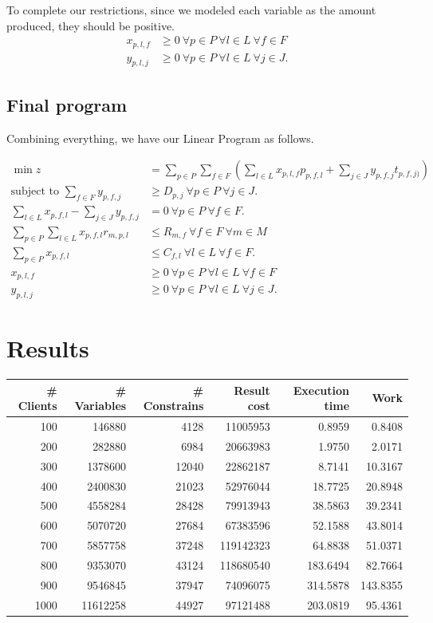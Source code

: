 \documentclass[11pt]{article}
\theoremstyle{definition}
\theoremstyle{definition}
\theoremstyle{remark}
\theoremstyle{remark}
\theoremstyle{remark}
\theoremstyle{remark}
\theoremstyle{definition}
\begin{document}
To complete our restrictions, since we modeled each variable as the amount produced, they should be positive.
\begin{align*}
x_{p,l,f} &\geq 0 \ \forall p \in P \ \forall l \in L \ \forall f \in F \\
y_{p,l,j} &\geq 0 \ \forall p \in P \ \forall l \in L \ \forall j \in J.
\end{align*}
\subsection*{Final program}
\label{sec:orgcc6b210}
Combining everything, we have our Linear Program as follows.


\begin{align*}
\min z &= \sum \limits_{p \in P} \sum_{f \in F} (\sum \limits_{l \in L} x_{p,l,f}p_{p,f,l} + \sum_{j \in J} y_{p,f,j}t_{p,f,j)}) \\
\text{subject to } \sum_{f \in F} y_{p,f,j} &\geq D_{p,j} \ \forall p \in P \ \forall j \in J. \\
\sum \limits_{l \in L} x_{p,f,l} - \sum_{j \in J} y_{p,f,j} &= 0 \ \forall p \in P \ \forall f \in F . \\
\sum \limits_{p \in P} \sum \limits_{l \in L} x_{p,f,l}r_{m,p,l} &\leq R_{m,f} \ \forall f \in F \ \forall m \in M \\
\sum_{p \in P} x_{p,f,l} &\leq C_{f,l} \ \forall l \in L \ \forall f \in F. \\
x_{p,l,f} &\geq 0 \ \forall p \in P \ \forall l \in L \ \forall f \in F \\
y_{p,l,j} &\geq 0 \ \forall p \in P \ \forall l \in L \ \forall j \in J.
\end{align*}

\section*{Results}
\label{sec:org6a56f91}

\begin{center}
\begin{tabular}{rrrrrr}
\# Clients & \# Variables & \# Constrains & Result cost & Execution time & Work\\
\hline
100 & 146880 & 4128 & 11005953 & 0.8959 & 0.8408\\
200 & 282880 & 6984 & 20663983 & 1.9750 & 2.0171\\
300 & 1378600 & 12040 & 22862187 & 8.7141 & 10.3167\\
400 & 2400830 & 21023 & 52976044 & 18.7725 & 20.8948\\
500 & 4558284 & 28428 & 79913943 & 38.5863 & 39.2341\\
600 & 5070720 & 27684 & 67383596 & 52.1588 & 43.8014\\
700 & 5857758 & 37248 & 119142323 & 64.8838 & 51.0371\\
800 & 9353070 & 43124 & 118680540 & 183.6494 & 82.7664\\
900 & 9546845 & 37947 & 74096075 & 314.5878 & 143.8355\\
1000 & 11612258 & 44927 & 97121488 & 203.0819 & 95.4361\\
\end{tabular}
\end{center}
\end{document}
